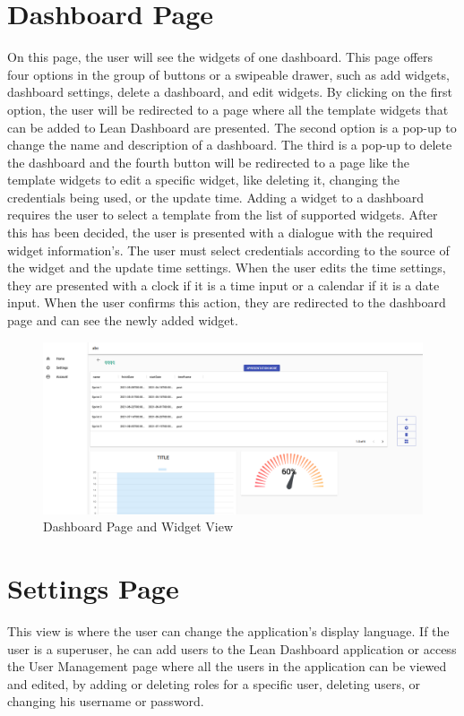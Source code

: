 \documentclass[a4paper,twoside,10pt]{report}
\begin{document}
\newpage
\section{Dashboard Page}
On this page, the user will see the widgets of one dashboard. This page offers four options in the group of buttons or a swipeable drawer, such as add widgets, dashboard settings, delete a dashboard, and edit widgets.
By clicking on the first option, the user will be redirected to a page where all the template widgets that can be added to Lean Dashboard are presented.
The second option is a pop-up to change the name and description of a dashboard.
The third is a pop-up to delete the dashboard and the fourth button will be redirected to a page like the template widgets to edit a specific widget, like deleting it, changing the credentials being used, or the update time.
\newline
Adding a widget to a dashboard requires the user to select a template from the list of supported widgets.
After this has been decided, the user is presented with a dialogue with the required widget information's.
The user must select credentials according to the source of the widget and the update time settings.
When the user edits the time settings, they are presented with a clock if it is a time input or a calendar if it is a date input.
When the user confirms this action, they are redirected to the dashboard page and can see the newly added widget.

\begin{figure}[h!]
\center
    \includegraphics[width=\textwidth]{dashboardPage.png}
\caption{Dashboard Page and Widget View}
\end{figure}

\section{Settings Page}
This view is where the user can change the application's display language. If the user is a superuser, he can add users to the Lean Dashboard application or access the User Management page where all the users in the application can be viewed and edited, by adding or deleting roles for a specific user, deleting users, or changing his username or password. 
\end{document}
